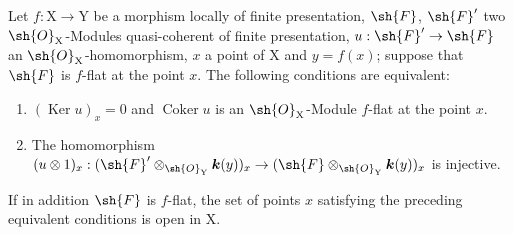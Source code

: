 \begin{proposition}[11.3.7]
\label{IV.11.3.7}
Let $f:\mathrm{X}\to\mathrm{Y}$ be a morphism locally of finite presentation, $\sh{F}$, $\sh{F}'$ two $\sh{O}_\mathrm{X}$-Modules quasi-coherent of finite presentation, $u:\sh{F}'\to\sh{F}$ an $\sh{O}_\mathrm{X}$-homomorphism, $x$ a point of $\mathrm{X}$ and $y=f(x)$; suppose that $\sh{F}$ is $f$-flat at the point $x$. The following conditions are equivalent:
\begin{enumerate}[label=\emph{\alph*)}]
  \item $(\operatorname{Ker} u)_x=0$ and $\operatorname{Coker} u$ is an $\sh{O}_\mathrm{X}$-Module $f$-flat at the point $x$.
  \item The homomorphism $(u\otimes 1)_x:(\sh{F}'\otimes_{\sh{O}_\mathrm{Y}}\boldsymbol{k}(y))_x\to(\sh{F}\otimes_{\sh{O}_\mathrm{Y}}\boldsymbol{k}(y))_x$ is injective.
\end{enumerate}
If in addition $\sh{F}$ is $f$-flat, the set of points $x$ satisfying the preceding equivalent conditions is open in $\mathrm{X}$.
\end{proposition}

